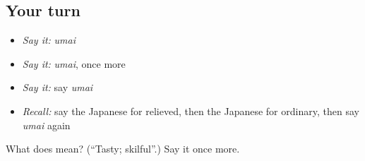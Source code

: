 \subsection*{Your turn}
\begin{itemize}
\raggedright
  \item \emph{Say it:} \emph{umai}
  \item \emph{Say it:} \emph{umai}, once more
  \item \emph{Say it:} say \emph{umai}
  \item \emph{Recall:} say the Japanese for relieved, then the Japanese for ordinary, then say \emph{umai} again
\end{itemize}

\begin{tcolorbox}[breakable,colback=teal!4,colframe=teal!35!black,title={Before you move on}]
What does  mean? (\textquotedblleft{}Tasty; skilful\textquotedblright{}.) Say it once more.
\end{tcolorbox}
